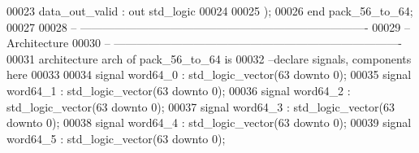 \begin{DoxyCode}
00023         \textcolor{vhdlchar}{data_out_valid}  \textcolor{vhdlchar}{:} \textcolor{keywordflow}{out} \textcolor{comment}{std\_logic}
00024        
00025         \textcolor{vhdlchar}{)};
00026 \textcolor{keywordflow}{end} \textcolor{vhdlchar}{pack\_56\_to\_64};
00027 
00028 \textcolor{keyword}{-- ----------------------------------------------------------------------------}
00029 \textcolor{keyword}{-- Architecture}
00030 \textcolor{keyword}{-- ----------------------------------------------------------------------------}
00031 \textcolor{keywordflow}{architecture} arch \textcolor{keywordflow}{of} pack_56_to_64 is
00032 \textcolor{keyword}{--declare signals,  components here}
00033 
00034 \textcolor{keywordflow}{signal} \textcolor{vhdlchar}{word64_0}                 \textcolor{vhdlchar}{:} \textcolor{comment}{std\_logic\_vector}\textcolor{vhdlchar}{(}\textcolor{vhdllogic}{}\textcolor{vhdllogic}{63} \textcolor{keywordflow}{downto} \textcolor{vhdllogic}{}\textcolor{vhdllogic}{0}\textcolor{vhdlchar}{)};
00035 \textcolor{keywordflow}{signal} \textcolor{vhdlchar}{word64_1}                 \textcolor{vhdlchar}{:} \textcolor{comment}{std\_logic\_vector}\textcolor{vhdlchar}{(}\textcolor{vhdllogic}{}\textcolor{vhdllogic}{63} \textcolor{keywordflow}{downto} \textcolor{vhdllogic}{}\textcolor{vhdllogic}{0}\textcolor{vhdlchar}{)};
00036 \textcolor{keywordflow}{signal} \textcolor{vhdlchar}{word64_2}                 \textcolor{vhdlchar}{:} \textcolor{comment}{std\_logic\_vector}\textcolor{vhdlchar}{(}\textcolor{vhdllogic}{}\textcolor{vhdllogic}{63} \textcolor{keywordflow}{downto} \textcolor{vhdllogic}{}\textcolor{vhdllogic}{0}\textcolor{vhdlchar}{)};
00037 \textcolor{keywordflow}{signal} \textcolor{vhdlchar}{word64_3}                 \textcolor{vhdlchar}{:} \textcolor{comment}{std\_logic\_vector}\textcolor{vhdlchar}{(}\textcolor{vhdllogic}{}\textcolor{vhdllogic}{63} \textcolor{keywordflow}{downto} \textcolor{vhdllogic}{}\textcolor{vhdllogic}{0}\textcolor{vhdlchar}{)};
00038 \textcolor{keywordflow}{signal} \textcolor{vhdlchar}{word64_4}                 \textcolor{vhdlchar}{:} \textcolor{comment}{std\_logic\_vector}\textcolor{vhdlchar}{(}\textcolor{vhdllogic}{}\textcolor{vhdllogic}{63} \textcolor{keywordflow}{downto} \textcolor{vhdllogic}{}\textcolor{vhdllogic}{0}\textcolor{vhdlchar}{)};
00039 \textcolor{keywordflow}{signal} \textcolor{vhdlchar}{word64_5}                 \textcolor{vhdlchar}{:} \textcolor{comment}{std\_logic\_vector}\textcolor{vhdlchar}{(}\textcolor{vhdllogic}{}\textcolor{vhdllogic}{63} \textcolor{keywordflow}{downto} \textcolor{vhdllogic}{}\textcolor{vhdllogic}{0}\textcolor{vhdlchar}{)};

\end{DoxyCode}
